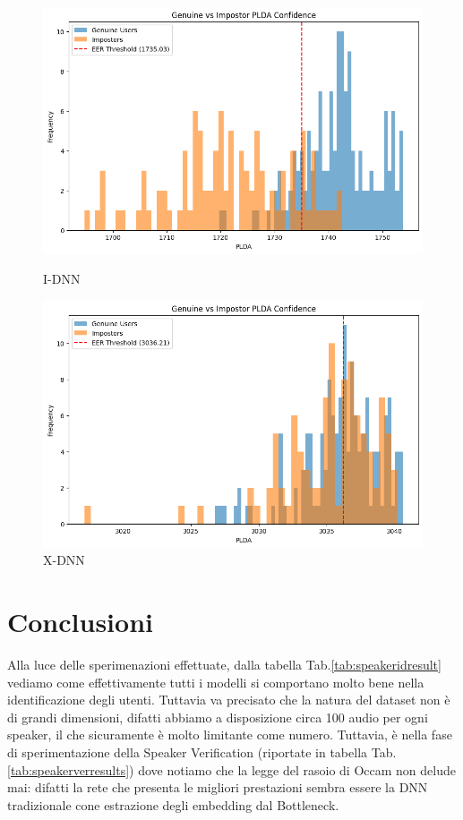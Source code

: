 \begin{figure}[ht]
    \begin{minipage}{0.47\textwidth}
        \centering
        \includegraphics[width=\textwidth]{./ch4/idnn.png}
        \caption{I-DNN}
    \end{minipage}
    \begin{minipage}{0.47\textwidth}
        \centering
        \includegraphics[width=\textwidth]{./ch4/xdnn.png}
        \caption{X-DNN}
    \end{minipage}
\end{figure}


\clearpage

\section{Conclusioni}
Alla luce delle sperimenazioni effettuate, dalla tabella Tab.\ref{tab:speakeridresult} vediamo come effettivamente
tutti i modelli si comportano molto bene nella identificazione degli utenti. Tuttavia va precisato che la natura del dataset non è
di grandi dimensioni, difatti abbiamo a disposizione circa 100 audio per ogni speaker, il che sicuramente è molto limitante come numero. 
Tuttavia, è nella fase di sperimentazione della Speaker Verification (riportate in tabella Tab.\ref{tab:speakerverresults}) dove notiamo che la 
legge del rasoio di Occam non delude mai: difatti la rete che presenta le migliori prestazioni sembra essere la DNN tradizionale cone 
estrazione degli embedding dal Bottleneck.

